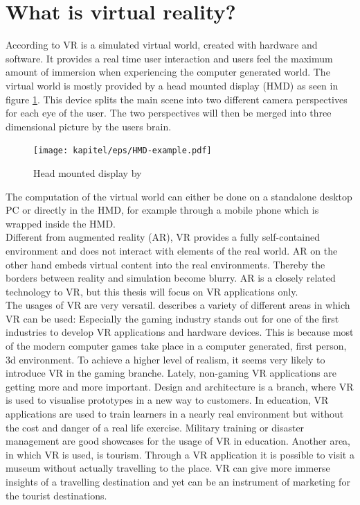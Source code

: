\section{What is virtual reality?}
According to \cite{Fuchs.2011} VR is a simulated virtual world, created with hardware and software. It provides a real time user interaction and users feel the maximum amount of immersion when experiencing the computer generated world. The virtual world is mostly provided by a head mounted display (HMD) as seen in figure \ref{fig:hmd}. This device splits the main scene into two different camera perspectives for each eye of the user. The two perspectives will then be merged into three dimensional picture by the users brain. \\
\begin{figure}[h!]
  \texttt{[image: kapitel/eps/HMD-example.pdf]}
  \centering
  \caption{Head mounted display by}
  \label{fig:hmd}
\end{figure}
The computation of the virtual world can either be done on a standalone desktop PC or directly in the HMD, for example through a mobile phone which is wrapped inside the HMD.\\
Different from augmented reality (AR), VR provides a fully self-contained environment and does not interact with elements of the real world. AR on the other hand embeds virtual content into the real environments. Thereby the borders between reality and simulation become blurry. AR is a closely related technology to VR, but this thesis will focus on VR applications only.\\
The usages of VR are very versatil. \cite{Linowes.2015} describes a variety of different areas in which VR can be used: Especially the gaming industry stands out for one of the first industries to develop VR applications and hardware devices. This is because most of the modern computer games take place in a computer generated, first person, 3d environment. To achieve a higher level of realism, it seems very likely to introduce VR in the gaming branche. Lately, non-gaming VR applications are getting more and more important. Design and architecture is a branch, where VR is used to visualise prototypes in a new way to customers. In education, VR applications are used to train learners in a nearly real environment but without the cost and danger of a real life exercise. Military training or disaster management are good showcases for the usage of VR in education. Another area, in which VR is used, is tourism. Through a VR application it is possible to visit a museum without actually travelling to the place. VR can give more immerse insights of a travelling destination and yet can be an instrument of marketing for the tourist destinations.

